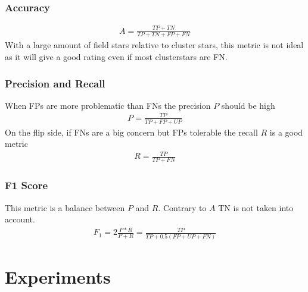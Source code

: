 \documentclass[letterpaper,10pt,english]{sphinxmanual}
\begin{document}
\subsection{Accuracy}
\label{\detokenize{NBodySimulation/Clustering:accuracy}}\begin{equation*}
\begin{split}A = \frac{TP+TN}{TP+TN+FP+FN}\end{split}
\end{equation*}
\sphinxAtStartPar
With a large amount of field stars relative to cluster stars, this metric is not ideal as it will give a good rating even if most clusterstars are FN.


\subsection{Precision and Recall}
\label{\detokenize{NBodySimulation/Clustering:precision-and-recall}}
\sphinxAtStartPar
When FPs are more problematic than FNs the precision \(P\) should be high
\begin{equation*}
\begin{split}P = \frac{TP}{TP+FP+UP}\end{split}
\end{equation*}
\sphinxAtStartPar
On the flip side, if FNs are a big concern but FPs tolerable the recall \(R\) is a good metric
\begin{equation*}
\begin{split}R = \frac{TP}{TP+FN}\end{split}
\end{equation*}

\subsection{F1 Score}
\label{\detokenize{NBodySimulation/Clustering:f1-score}}
\sphinxAtStartPar
This metric is a balance between \(P\) and \(R\). Contrary to \(A\) TN is not taken into account.
\begin{equation*}
\begin{split}F_1 = 2 \frac{P*R}{P+R} = \frac{TP}{TP+0.5(FP+UP+FN)}\end{split}
\end{equation*}

\chapter{Experiments}
\label{\detokenize{NBodySimulation/Experiments:experiments}}\label{\detokenize{NBodySimulation/Experiments::doc}}
\end{document}
